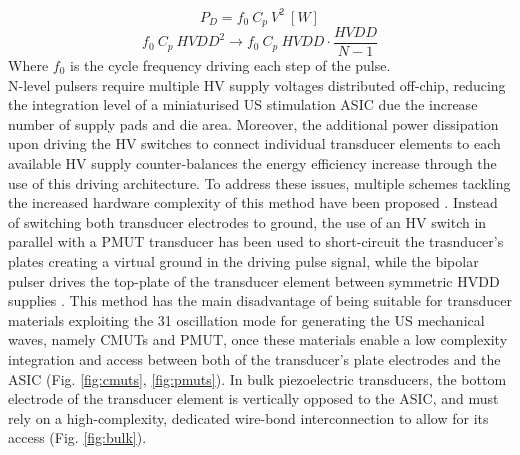 \begin{equation}
    \label{eq:power_dissipation_cap}
    P_D = f_{0}  \ C_p \ V^2 \ [W]
\end{equation}
\begin{equation}
    \label{eq:dynamic_power_dissipation_reduction}
    f_0 \ C_p \ HVDD^2 \longrightarrow f_0 \ C_p \ HVDD \cdot \frac{HVDD}{N-1}
\end{equation}
Where $f_0$ is the cycle frequency driving each step of the pulse.
\\
N-level pulsers require multiple HV supply voltages distributed off-chip, reducing the integration level of a miniaturised US stimulation ASIC due the increase number of supply pads and die area. Moreover, the additional power dissipation upon driving the HV switches to connect individual transducer elements to each available HV supply counter-balances the energy efficiency increase through the use of this driving architecture. To address these issues, multiple schemes tackling the increased hardware complexity of this method have been proposed \cite{ref1,ref2,ref3,...}.  Instead of switching both transducer electrodes to ground, the use of an HV switch in parallel with a PMUT transducer has been used to short-circuit the trasnducer's plates creating a virtual ground in the driving pulse signal, while the bipolar pulser drives the top-plate of the transducer element between symmetric HVDD supplies \cite{}. This method has the main disadvantage of being suitable for transducer materials exploiting the 31 oscillation mode for generating the US mechanical waves, namely CMUTs and PMUT, once these materials enable a low complexity integration and access between both of the transducer's plate electrodes and the ASIC (Fig. \ref{fig:cmuts}, \ref{fig:pmuts}). In bulk piezoelectric transducers, the bottom electrode of the transducer element is vertically opposed to the ASIC, and must rely on a high-complexity, dedicated wire-bond interconnection to allow for its access (Fig. \ref{fig:bulk}).  
